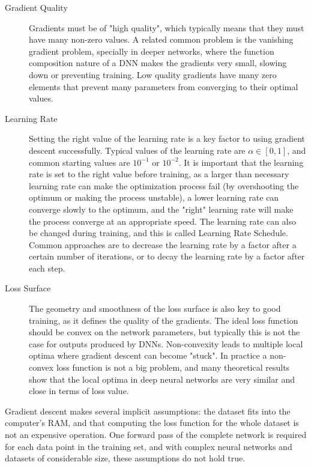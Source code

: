 \begin{description}
	\item[Gradient Quality] Gradients must be of "high quality", which typically means that they must have many non-zero values. A related common problem is the vanishing gradient problem, specially in deeper networks, where the function composition nature of a DNN makes the gradients very small, slowing down or preventing training. Low quality gradients have many zero elements that prevent many parameters from converging to their optimal values.
	
	\item[Learning Rate] Setting the right value of the learning rate is a key factor to using gradient descent successfully. Typical values of the learning rate are $ \alpha \in [0, 1]$, and common starting values are $10^{-1}$ or $10^{-2}$.
	It is important that the learning rate is set to the right value before training, as a larger than necessary learning rate can make the optimization process fail (by overshooting the optimum or making the process unstable), a lower learning rate can converge slowly to the optimum, and the "right" learning rate will make the process converge at an appropriate speed.
	The learning rate can also be changed during training, and this is called  Learning Rate Schedule. Common approaches are to decrease the learning rate by a factor after a certain number of iterations, or to decay the learning rate by a factor after each step.
	
	\item[Loss Surface] The geometry and smoothness of the loss surface is also key to good training, as it defines the quality of the gradients. The ideal loss function should be convex on the network parameters, but typically this is not the case for outputs produced by DNNs. Non-convexity leads to multiple local optima where gradient descent can become "stuck". In practice a non-convex loss function is not a big problem, and many theoretical results show that the local optima in deep neural networks are very similar and close in terms of loss value.
\end{description}

Gradient descent makes several implicit assumptions: the dataset fits into the computer's RAM, and that computing the loss function for the whole dataset is not an expensive operation. One forward pass of the complete network is required for each data point in the training set, and with complex neural networks and datasets of considerable size, these assumptions do not hold true.

